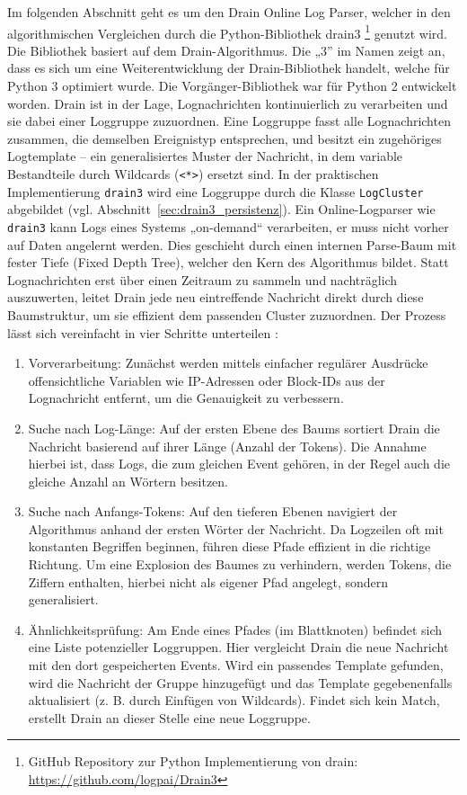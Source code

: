 Im folgenden Abschnitt geht es um den Drain Online Log Parser, welcher in den algorithmischen Vergleichen durch die Python-Bibliothek drain3 \footnote{GitHub Repository zur Python Implementierung von drain: \url{https://github.com/logpai/Drain3}} genutzt wird. Die Bibliothek basiert auf dem Drain-Algorithmus. Die „3” im Namen zeigt an, dass es sich um eine Weiterentwicklung der Drain-Bibliothek handelt, welche für Python 3 optimiert wurde. Die Vorgänger-Bibliothek war für Python 2 entwickelt worden. 
Drain ist in der Lage, Lognachrichten kontinuierlich zu verarbeiten und sie dabei einer Loggruppe zuzuordnen. Eine Loggruppe fasst alle Lognachrichten zusammen, die demselben Ereignistyp entsprechen, und besitzt ein zugehöriges Logtemplate -- ein generalisiertes Muster der Nachricht, in dem variable Bestandteile durch Wildcards (\texttt{<*>}) ersetzt sind. In der praktischen Implementierung \texttt{drain3} wird eine Loggruppe durch die Klasse \texttt{LogCluster} abgebildet (vgl. Abschnitt~\ref{sec:drain3_persistenz}). Ein Online-Logparser wie \texttt{drain3} kann Logs eines Systems „on-demand“ verarbeiten, er muss nicht vorher auf Daten angelernt werden. Dies geschieht durch einen internen Parse-Baum mit fester Tiefe (Fixed Depth Tree), welcher den Kern des Algorithmus bildet. Statt Lognachrichten erst über einen Zeitraum zu sammeln und nachträglich auszuwerten, leitet Drain jede neu eintreffende Nachricht direkt durch diese Baumstruktur, um sie effizient dem passenden Cluster zuzuordnen. Der Prozess lässt sich vereinfacht in vier Schritte unterteilen \cite[Abschn.~III]{drain}:

\begin{enumerate}
    \item Vorverarbeitung: Zunächst werden mittels einfacher regulärer Ausdrücke offensichtliche Variablen wie IP-Adressen oder Block-IDs aus der Lognachricht entfernt, um die Genauigkeit zu verbessern.
    \item Suche nach Log-Länge: Auf der ersten Ebene des Baums sortiert Drain die Nachricht basierend auf ihrer Länge (Anzahl der Tokens). Die Annahme hierbei ist, dass Logs, die zum gleichen Event gehören, in der Regel auch die gleiche Anzahl an Wörtern besitzen.
    \item Suche nach Anfangs-Tokens: Auf den tieferen Ebenen navigiert der Algorithmus anhand der ersten Wörter der Nachricht. Da Logzeilen oft mit konstanten Begriffen beginnen, führen diese Pfade effizient in die richtige Richtung. Um eine Explosion des Baumes zu verhindern, werden Tokens, die Ziffern enthalten, hierbei nicht als eigener Pfad angelegt, sondern generalisiert.
    \item Ähnlichkeitsprüfung: Am Ende eines Pfades (im Blattknoten) befindet sich eine Liste potenzieller Loggruppen. Hier vergleicht Drain die neue Nachricht mit den dort gespeicherten Events. Wird ein passendes Template gefunden, wird die Nachricht der Gruppe hinzugefügt und das Template gegebenenfalls aktualisiert (z. B. durch Einfügen von Wildcards). Findet sich kein Match, erstellt Drain an dieser Stelle eine neue Loggruppe.
\end{enumerate}

